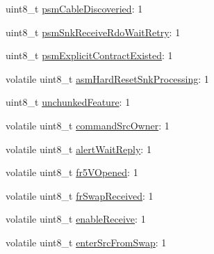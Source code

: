 \begin{DoxyCompactItemize}
\item 
uint8\-\_\-t \hyperlink{struct__pd__instance_af7a143c0a8141d2a359a5ce18eb708f6}{psm\-Cable\-Discoveried}\-: 1
\item 
uint8\-\_\-t \hyperlink{struct__pd__instance_a685445e828df5a05b1084fd0ea75c10a}{psm\-Snk\-Receive\-Rdo\-Wait\-Retry}\-: 1
\item 
uint8\-\_\-t \hyperlink{struct__pd__instance_a23dce9c00575a5fd5ed120e08e9c4412}{psm\-Explicit\-Contract\-Existed}\-: 1
\item 
volatile uint8\-\_\-t \hyperlink{struct__pd__instance_a7420286a3fc5b58010ff2dc607a8d77a}{asm\-Hard\-Reset\-Snk\-Processing}\-: 1
\item 
uint8\-\_\-t \hyperlink{struct__pd__instance_af61039550d3e5b4f070ac74ed3e711a3}{unchunked\-Feature}\-: 1
\item 
volatile uint8\-\_\-t \hyperlink{struct__pd__instance_ac9c3ed52c22920ccea6ecd0d1e0f6651}{command\-Src\-Owner}\-: 1
\item 
volatile uint8\-\_\-t \hyperlink{struct__pd__instance_ae144ddf17de553d955ce28afa535d4f9}{alert\-Wait\-Reply}\-: 1
\item 
volatile uint8\-\_\-t \hyperlink{struct__pd__instance_a3ec5ee7a312bb3b142e16fc8ba019476}{fr5\-V\-Opened}\-: 1
\item 
volatile uint8\-\_\-t \hyperlink{struct__pd__instance_ac9684a4a5a96ac21f503ad702a245a7e}{fr\-Swap\-Received}\-: 1
\item 
volatile uint8\-\_\-t \hyperlink{struct__pd__instance_a7ac775fb724d971003420ee22adc0fbe}{enable\-Receive}\-: 1
\item 
volatile uint8\-\_\-t \hyperlink{struct__pd__instance_a3b09927227c17d95712a2af3d5f921f2}{enter\-Src\-From\-Swap}\-: 1
\end{DoxyCompactItemize}


